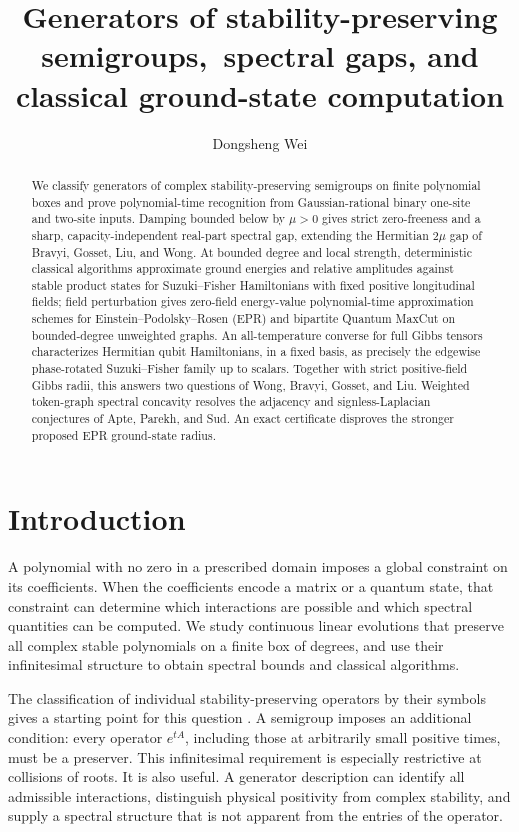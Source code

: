 \documentclass[reqno]{amsart}
\title[Stability generators, spectral gaps, and computation]{Generators of stability-preserving semigroups,\ spectral gaps, and classical ground-state computation}
\author{Dongsheng Wei}
\date{}
\theoremstyle{definition}
\theoremstyle{remark}
\begin{document}
\begin{abstract}
We classify generators of complex stability-preserving semigroups on
finite polynomial boxes and prove polynomial-time recognition from
Gaussian-rational binary one-site and two-site inputs.
Damping bounded below by \(\mu>0\) gives strict zero-freeness and
a sharp, capacity-independent real-part spectral gap, extending the Hermitian
\(2\mu\) gap of Bravyi, Gosset, Liu, and Wong.
At bounded degree and local strength, deterministic classical algorithms
approximate ground energies and relative amplitudes against stable product
states for Suzuki--Fisher Hamiltonians with fixed positive longitudinal fields;
field perturbation gives zero-field energy-value
polynomial-time approximation schemes for Einstein--Podolsky--Rosen
(EPR) and bipartite Quantum MaxCut on bounded-degree unweighted graphs.
An all-temperature converse for full Gibbs tensors characterizes
Hermitian qubit Hamiltonians, in a fixed basis, as precisely the
edgewise phase-rotated Suzuki--Fisher family up to scalars.
Together with strict positive-field Gibbs radii, this answers two
questions of Wong, Bravyi, Gosset, and Liu.
Weighted token-graph spectral concavity resolves the adjacency and
signless-Laplacian conjectures of Apte, Parekh, and Sud.
An exact certificate disproves the stronger proposed EPR ground-state
radius.
\end{abstract}
\maketitle
\clearpage
\tableofcontents
\section{Introduction}\label{intro:section}

A polynomial with no zero in a prescribed domain imposes a global
constraint on its coefficients. When the coefficients encode a matrix
or a quantum state, that constraint can determine which interactions
are possible and which spectral quantities can be computed. We study
continuous linear evolutions that preserve all complex stable
polynomials on a finite box of degrees, and use their infinitesimal
structure to obtain spectral bounds and classical algorithms.

The classification of individual stability-preserving operators by their
symbols gives a starting point for this question
\cite{BB09,BB10,BB10II}. A semigroup imposes an additional condition:
every operator $e^{tA}$, including those at arbitrarily small positive
times, must be a preserver. This infinitesimal requirement is especially
restrictive at collisions of roots. It is also useful. A generator
description can identify all admissible interactions, distinguish
physical positivity from complex stability, and supply a spectral
structure that is not apparent from the entries of the operator.
\end{document}

